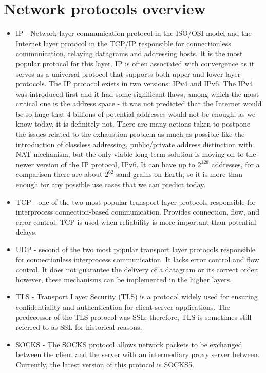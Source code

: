 \section{Network protocols overview}
\begin{itemize}
    \item IP - Network layer communication protocol in the ISO/OSI model and the Internet layer protocol in the TCP/IP responsible for connectionless communication, relaying datagrams and addressing hosts. It is the most popular protocol for this layer. IP is often associated with convergence as it serves as a universal protocol that supports both upper and lower layer protocols. The IP protocol exists in two versions: IPv4 and IPv6. The IPv4 was introduced first and it had some significant flaws, among which the most critical one is the address space - it was not predicted that the Internet would be so huge that 4 billions of potential addresses would not be enough; as we know today, it is definitely not. There are many actions taken to postpone the issues related to the exhaustion problem as much as possible like the introduction of classless addressing, public/private address distinction with NAT mechanism, but the only viable long-term solution is moving on to the newer version of the IP protocol, IPv6. It can have up to $2^{128}$ addresses, for a comparison there are about ${2^62}$ sand grains on Earth, so it is more than enough for any possible use cases that we can predict today.
    \item TCP - one of the two most popular transport layer protocols responsible for interprocess connection-based communication. Provides connection, flow, and error control. TCP is used when reliability is more important than potential delays.
    \item UDP - second of the two most popular transport layer protocols responsible for connectionless interprocess communication. It lacks error control and flow control. It does not guarantee the delivery of a datagram or its correct order; however, these mechanisms can be implemented in the higher layers.
    \item TLS - Transport Layer Security (TLS) is a protocol widely used for ensuring confidentiality and authentication for client-server applications. The predecessor of the TLS protocol was SSL; therefore, TLS is sometimes still referred to as SSL for historical reasons. 
    \item SOCKS - The SOCKS protocol allows network packets to be exchanged between the client and the server with an intermediary proxy server between. Currently, the latest version of this protocol is SOCKS5.

\end{itemize}
